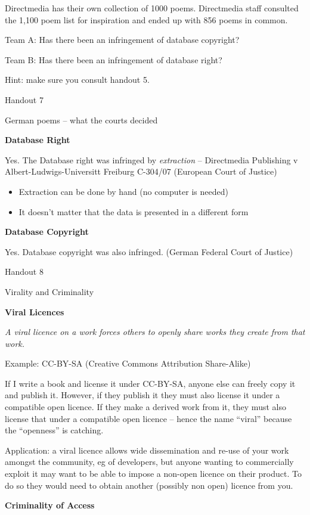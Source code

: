 \documentclass{article}
\begin{document}
Directmedia has their own collection of 1000 poems. Directmedia staff
consulted the 1,100 poem list for inspiration and ended up with 856
poems in common.

Team A: Has there been an infringement of database copyright?

Team B: Has there been an infringement of database right?

Hint: make sure you consult handout 5.

Handout 7

German poems -- what the courts decided

\textbf{Database Right}

Yes. The Database right was infringed by \emph{extraction} --
Directmedia Publishing v Albert-Ludwigs-Universitt Freiburg C-304/07
(European Court of Justice)

\begin{itemize}
\item
  Extraction can be done by hand (no computer is needed)
\item
  It doesn't matter that the data is presented in a different form
\end{itemize}

\textbf{Database Copyright}

Yes. Database copyright was also infringed. (German Federal Court of
Justice)

Handout 8

Virality and Criminality

\textbf{Viral Licences}

\emph{A viral licence on a work forces others to openly share works they
create from that work.}

Example: CC-BY-SA (Creative Commons Attribution Share-Alike)

If I write a book and license it under CC-BY-SA, anyone else can freely
copy it and publish it. However, if they publish it they must also
license it under a compatible open licence. If they make a derived work
from it, they must also license that under a compatible open licence --
hence the name ``viral'' because the ``openness'' is catching.

Application: a viral licence allows wide dissemination and re-use of
your work amongst the community, eg of developers, but anyone wanting to
commercially exploit it may want to be able to impose a non-open licence
on their product. To do so they would need to obtain another (possibly
non open) licence from you.

\textbf{Criminality of Access}
\end{document}
